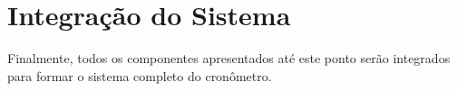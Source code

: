 \section{Integração do Sistema}

Finalmente, todos os componentes apresentados até este ponto serão integrados para formar o sistema completo do cronômetro.





